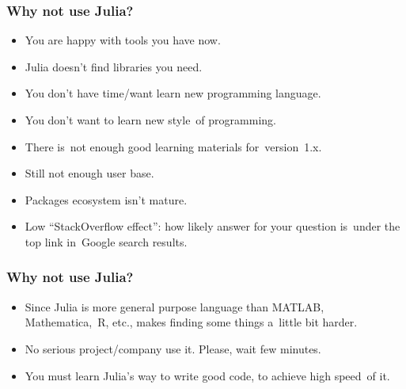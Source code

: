 \documentclass[10pt,t]{beamer}
\begin{document}
\begin{frame}
  \frametitle{Why not use Julia?}


  \begin{itemize}

  \item You are happy with tools you have now.

  \item Julia doesn't find libraries you need.

  \item You don't have time/want learn new programming language.

  \item You don't want to learn new style~of programming.

  \item There is~not enough good learning materials for~version~1.x.

  \item Still not enough user base.

  \item Packages ecosystem isn't mature.

  \item Low ``StackOverflow effect'': how likely answer for your
    question is~under the top link in~Google search results.

  \end{itemize}

\end{frame}





\begin{frame}
  \frametitle{Why not use Julia?}


  \begin{itemize}

  \item Since Julia is more general purpose language than MATLAB,
    Mathematica,~R, etc., makes finding some things a~little bit
    harder.

  \item No serious project/company use it. Please, \alert{wait} few
    minutes.

  \item You \alert{must} learn Julia's way to write good code, to
    achieve high speed~of it.

  \end{itemize}

\end{frame}
\end{document}
